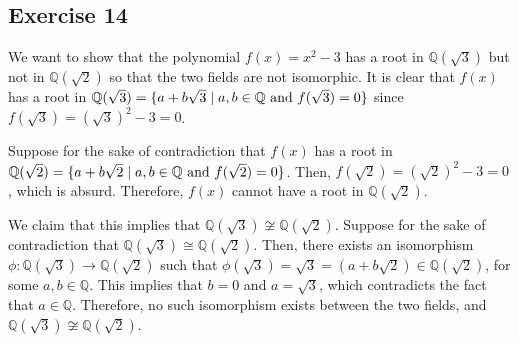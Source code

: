 \subsection*{Exercise 14}
We want to show that the polynomial $f(x) = x^2 - 3$ has a root in $\mathbb{Q}(\sqrt{3})$ but not in $\mathbb{Q}(\sqrt{2})$ so that the two fields are not isomorphic. It is clear that $f(x)$ has a root in $\mathbb{Q}(\sqrt{3}) = \{a + b\sqrt{3} \mid a,b \in \mathbb{Q} \textnormal{ and } f(\sqrt{3}) = 0 \}$ since $f(\sqrt{3}) = (\sqrt{3})^2 - 3 = 0$.

Suppose for the sake of contradiction that $f(x)$ has a root in $\mathbb{Q}(\sqrt{2})= \{a + b\sqrt{2} \mid a,b \in \mathbb{Q} \textnormal{ and } f(\sqrt{2}) = 0 \}$. Then, $f(\sqrt{2}) = (\sqrt{2})^2 - 3 = 0$, which is absurd. Therefore, $f(x)$ cannot have a root in $\mathbb{Q}(\sqrt{2})$.

We claim that this implies that $\mathbb{Q}(\sqrt{3}) \not\cong \mathbb{Q}(\sqrt{2})$. Suppose for the sake of contradiction that $\mathbb{Q}(\sqrt{3}) \cong \mathbb{Q}(\sqrt{2})$. Then, there exists an isomorphism $\phi: \mathbb{Q}(\sqrt{3}) \rightarrow \mathbb{Q}(\sqrt{2})$ such that $\phi(\sqrt{3}) = \sqrt{3} = (a + b\sqrt{2}) \in \mathbb{Q}(\sqrt{2})$, for some $a,b \in \mathbb{Q}$. This implies that $b = 0$ and $a = \sqrt{3}$, which contradicts the fact that $a \in \mathbb{Q}$. Therefore, no such isomorphism exists between the two fields, and $\mathbb{Q}(\sqrt{3}) \not\cong \mathbb{Q}(\sqrt{2})$.